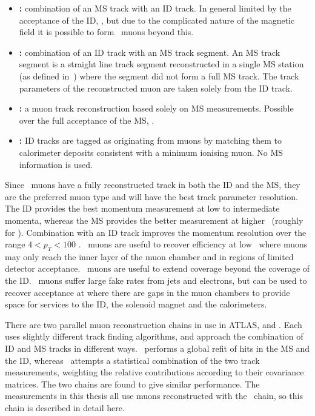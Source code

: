 \begin{itemize}

    \item {\bf \combined:} combination of an MS track with an ID track. In
    general limited by the acceptance of the ID, , but due to the complicated
    nature of the magnetic field it is possible to form \combined\ muons beyond
    this.

    \item {\bf \segmentTagged:} combination of an ID track with an MS track
    segment. An MS track segment is a straight line track segment reconstructed
    in a single MS station (as defined in~) where the segment did not form a full MS track. The
    track parameters of the reconstructed muon are taken solely from the ID
    track.

    \item {\bf \standAlone:} a muon track reconstruction based solely on 
    MS measurements. Possible over the full acceptance of the MS,
    .

    \item {\bf \caloTagged:} ID tracks are tagged as originating from
    muons by matching them to calorimeter deposits consistent with a minimum ionising
    muon. No MS information is used.


\end{itemize}

Since \combined\ muons have a fully reconstructed track in both the ID and the
MS, they are the preferred muon type and will have the best track parameter
resolution. The ID provides the best momentum measurement at low to intermediate
momenta, whereas the MS provides the better measurement at higher \pt\ (roughly
for ). Combination with an ID track improves the momentum resolution
over the range $4 < p_{T} < 100$ \GeV. \segmentTagged\ muons are useful to recover
efficiency at low \pt\ where muons may only reach the inner layer of the muon
chamber and in regions of limited detector acceptance. \standAlone\ muons are
useful to extend coverage beyond the coverage of the ID. \caloTagged\
muons suffer large fake rates from jets and electrons, but can be used to
recover acceptance at \modetalt{0.1} where there are gaps in the muon chambers
to provide space for services to the ID, the solenoid magnet and the
calorimeters.

There are two parallel muon reconstruction chains in use in ATLAS,
\staco\cite{1742-6596-219-3-032052} and
\muid. Each uses slightly different track finding algorithms, and approach the
combination of ID and MS tracks in different ways. \muid\ performs a global
refit of hits in the MS and the ID, whereas \staco\ attempts a statistical
combination of the two track measurements, weighting the relative contributions
according to their covariance matrices. The two chains are found to give similar
performance. The measurements in this thesis all use muons
reconstructed with the \staco\ chain, so this chain is described in detail here.

